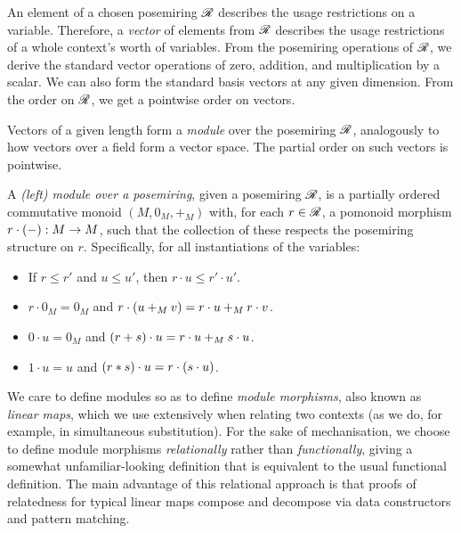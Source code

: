 An element of a chosen posemiring $\mathscr R$ describes the usage restrictions on
a variable.
Therefore, a \emph{vector} of elements from $\mathscr R$ describes the usage
restrictions of a whole context's worth of variables.
From the posemiring operations of $\mathscr R$, we derive the standard vector
operations of zero, addition, and multiplication by a scalar.
We can also form the standard basis vectors at any given dimension.
From the order on $\mathscr R$, we get a pointwise order on vectors.

Vectors of a given length form a \emph{module} over the posemiring $\mathscr R$,
analogously to how vectors over a field form a vector space.
The partial order on such vectors is pointwise.

\begin{definition}
  A \emph{(left) module over a posemiring}, given a posemiring $\mathscr R$, is a
  partially ordered commutative monoid $(M, 0_M, +_M)$ with, for each
  $r \in \mathscr R$, a pomonoid morphism $r \cdot \plr{-} : M \to M$, such that the
  collection of these respects the posemiring structure on $r$.
  Specifically, for all instantiations of the variables:
  \begin{itemize}
      \item If $r \leq r'$ and $u \leq u'$, then $r \cdot u \leq r' \cdot u'$.
    \item $r \cdot 0_M = 0_M$ and
      $r \cdot \plr{u +_M v} = r \cdot u +_M r \cdot v$.
    \item $0 \cdot u = 0_M$ and
      $\plr{r + s} \cdot u = r \cdot u +_M s \cdot u$.
    \item $1 \cdot u = u$ and
      $\plr{r * s} \cdot u = r \cdot \plr{s \cdot u}$.
  \end{itemize}
\end{definition}

We care to define modules so as to define \emph{module morphisms}, also known
as \emph{linear maps}, which we use extensively when relating two contexts (as
we do, for example, in simultaneous substitution).
For the sake of mechanisation, we choose to define module morphisms
\emph{relationally} rather than \emph{functionally}, giving a somewhat
unfamiliar-looking definition that is equivalent to the usual functional
definition.
The main advantage of this relational approach is that proofs of relatedness
for typical linear maps compose and decompose via data constructors and
pattern matching.

